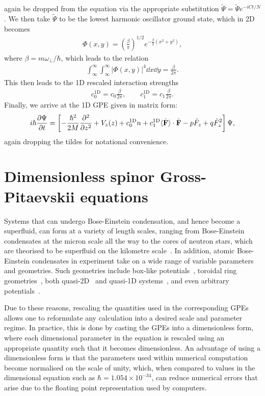 again be dropped from the equation via the appropriate substitution
\(\tilde{\Psi} = \tilde{\Psi}e^{-iCt/N}\).
We then take \(\tilde{\Psi}\) to be the lowest harmonic oscillator ground state,
which in 2D becomes
\begin{align}
    \Phi(x, y) = {\left(\frac{\beta}{\pi}\right)}^{1/2}
    e^{-\frac{\beta}{2}(x^2+y^2)},
\end{align}
where \(\beta=m\omega_\perp / \hbar \), which leads to the relation
\begin{align}
    \int_{\infty}^{\infty}\int_{\infty}^{\infty} |\Phi(x, y)|^4 \dd x \dd y
    = \frac{\beta}{2\pi}.
\end{align}
This then leads to the 1D rescaled interaction strengths
\begin{align}
    c_0^\text{1D} = c_0\frac{\beta}{2\pi}, \qquad
    c_1^\text{1D}=c_1\frac{\beta}{2\pi}.
\end{align}
Finally, we arrive at the 1D GPE given in matrix form:
\begin{align}
    i\hbar\pdv{\Psi}{t} = \left[-\frac{\hbar^2}{2M}
    \pdv[2]{}{z}+V_z(z) + c_0^\text{1D}n
    + c_1^\text{1D}\langle\hat{\vb{F}}\rangle \cdot \hat{\vb{F}} - p\hat{F}_z
    + q\hat{F}_z^2\right]\Psi,
\end{align}
again dropping the tildes for notational convenience.

\section{Dimensionless spinor Gross-Pitaevskii equations}
\label{sec: dimensionless-equations}
Systems that can undergo Bose-Einstein condensation, and hence become a
superfluid, can form at a variety of length scales, ranging from Bose-Einstein
condensates at the micron scale all the way to the cores of neutron stars,
which are theorised to be superfluid on the kilometre
scale~\cite{Warszawski2011}.
In addition, atomic Bose-Einstein condensates in experiment take on a wide range
of variable parameters and geometries.
Such geometries include box-like potentials~\cite{Gaunt2013}, toroidal ring
geometries~\cite{Ryu2007, Ramanathan2011}, both quasi-2D~\cite{Neely2010}
and quasi-1D systems~\cite{Burger1999}, and even arbitrary
potentials~\cite{Henderson2009}.

Due to these reasons, rescaling the quantities used in the corresponding GPEs
allows one to reformulate any calculation into a desired scale and parameter
regime.
In practice, this is done by casting the GPEs into a dimensionless form, where
each dimensional parameter in the equation is rescaled using an appropriate
quantity such that it becomes dimensionless.
An advantage of using a dimensionless form is that the parameters used within
numerical computation become normalised on the scale of unity, which,
when compared to values in the dimensional equation such as \(\hbar =
1.054\times 10^{-34}\), can reduce numerical errors that arise due to the
floating point representation used by computers.

